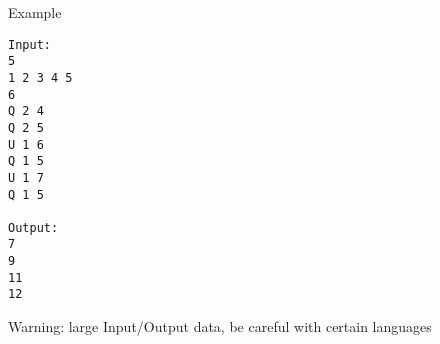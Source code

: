 Example
\begin{verbatim}
Input:
5
1 2 3 4 5
6
Q 2 4
Q 2 5
U 1 6
Q 1 5
U 1 7
Q 1 5

Output:
7
9
11
12

\end{verbatim}

Warning: large Input/Output data, be careful with certain languages